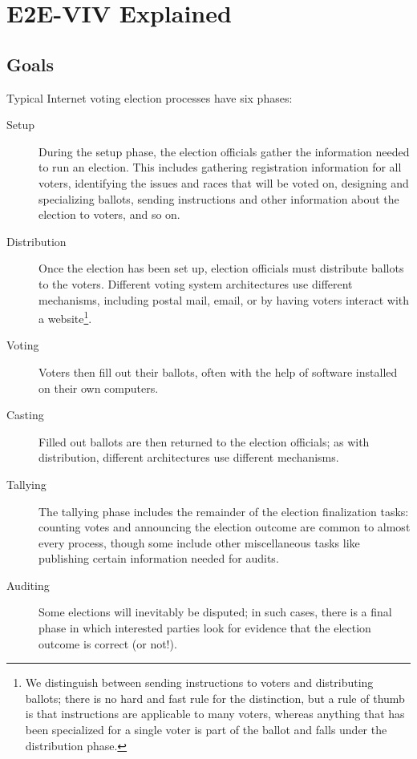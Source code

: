 \chapter{E2E-VIV Explained}
\label{chapter:e2e_viv_explained}


\section{Goals}
Typical Internet voting election processes have six phases:

\begin{description}
  \item[Setup] During the setup phase, the election officials gather the
    information needed to run an election. This includes gathering
    registration information for all voters, identifying the issues and
    races that will be voted on, designing and specializing ballots,
    sending instructions and other information about the election to voters,
    and so on.
  \item[Distribution] Once the election has been set up, election officials
    must distribute ballots to the voters. Different voting system
    architectures use different mechanisms, including postal mail, email, or
    by having voters interact with a website\footnote{We distinguish between
    sending instructions to voters and distributing ballots; there is no
    hard and fast rule for the distinction, but a rule of thumb is that
    instructions are applicable to many voters, whereas anything that has
    been specialized for a single voter is part of the ballot and falls
    under the distribution phase.}.
  \item[Voting] Voters then fill out their ballots, often with the help of
    software installed on their own computers.
  \item[Casting] Filled out ballots are then returned to the election
    officials; as with distribution, different architectures use different
    mechanisms.
  \item[Tallying] The tallying phase includes the remainder of the election
    finalization tasks: counting votes and announcing the election outcome
    are common to almost every process, though some include other
    miscellaneous tasks like publishing certain information needed for
    audits.
  \item[Auditing] Some elections will inevitably be disputed; in such cases,
    there is a final phase in which interested parties look for evidence
    that the election outcome is correct (or not!).
\end{description}

